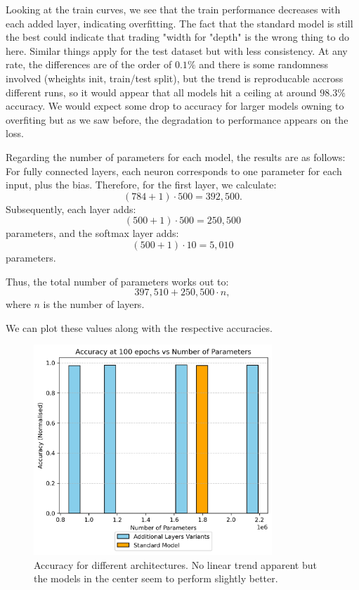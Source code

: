 \documentclass{article}
\begin{document}
Looking at the train curves, we see that the train performance decreases with each added layer, indicating overfitting.
The fact that the standard model is still the best could indicate that trading "width for "depth" is the wrong thing to do here.
Similar things apply for the test dataset but with less consistency.
At any rate, the differences are of the order of \(0.1\% \) and there is some randomness involved (wheights init, train/test split), but the trend is reproducable accross different runs, so it would appear that all models hit a ceiling at around \(98.3\%\) accuracy.
We would expect some drop to accuracy for larger models owning to overfiting but as we saw before, the degradation to performance appears on the loss.

Regarding the number of parameters for each model, the results are as follows:
For fully connected layers, each neuron corresponds to one parameter for each input, plus the bias. Therefore, for the first layer, we calculate:
\[
(784+1) \cdot 500 = 392,500.
\]
Subsequently, each layer adds:
\[
(500+1) \cdot 500 = 250,500
\]
parameters, and the softmax layer adds:
\[
(500+1) \cdot 10 = 5,010
\]
parameters. 

Thus, the total number of parameters works out to:
\[
397,510 + 250,500 \cdot n,
\]
where \(n\) is the number of layers.

We can plot these values along with the respective accuracies.

\begin{figure}[h!]
    \centering
    \includegraphics[width=0.8\textwidth]{./plots/plot11.png}  %
    \caption{Accuracy for different architectures. No linear trend apparent but the models in the center seem to perform slightly better.}
    \label{fig:plot11}  %
\end{figure}
\end{document}
